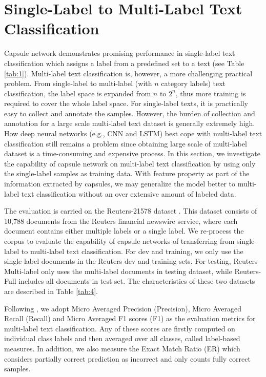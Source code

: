 \documentclass[11pt]{article}
\begin{document}
\section{Single-Label to Multi-Label Text Classification}
Capsule network demonstrates promising performance in single-label text classification which assigns a label from a predefined set to a text  (see Table  \ref{tab:1}).  Multi-label text classification is, however, a more challenging practical problem.
From single-label to multi-label (with $n$ category labels) text classification, the label space is expanded from $n$ to $2^n$, thus more training is required to cover the whole label space. For single-label texts, it is practically easy to collect and annotate the samples. However, the burden of collection and annotation for a large scale multi-label text dataset is generally extremely high. 
How deep neural networks (e.g., CNN and LSTM) best cope with multi-label text classification still remains a problem since obtaining large scale of multi-label dataset is a time-consuming and expensive process. 
In this section, we investigate the capability of capsule network on multi-label text classification by using only the single-label samples as training data.
With feature property as part of the information extracted by capsules, we may generalize the model better to multi-label text classification without an over extensive amount of labeled data.  

The evaluation is carried on the Reuters-21578 dataset \cite{LEWIS92b}. This dataset consists of 10,788 documents from the Reuters financial newswire service, where each document contains either multiple labels or a single label. We re-process the corpus to evaluate the capability of capsule networks of transferring from single-label to multi-label text classification. 
For dev and training, we only use the single-label documents in the Reuters dev and training sets. For testing, Reuters-Multi-label only uses the multi-label documents in testing dataset, while Reuters-Full includes all documents in test set.
The characteristics of these two datasets are described in Table \ref{tab:4}.

Following \cite{sorower2010literature}, we adopt Micro Averaged Precision (Precision), Micro Averaged Recall (Recall) and Micro Averaged F1 scores (F1) as the evaluation metrics for multi-label text classification. Any of these scores are firstly computed on individual class labels 
and then averaged over all classes, called label-based measures. 
In addition, we also measure the Exact Match Ratio (ER) which considers partially correct prediction as incorrect and only counts fully correct samples.
\end{document}
